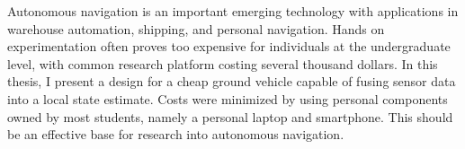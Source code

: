 \begin{abstractpage}
Autonomous navigation is an important emerging technology with applications in warehouse automation, shipping, and  personal navigation. Hands on experimentation often proves too expensive for individuals at the undergraduate level, with common research platform costing several thousand dollars. In this thesis, I present a design for a cheap ground vehicle capable of fusing sensor data into a local state estimate. Costs were minimized by using personal components owned by most students, namely a personal laptop and smartphone. This should be an effective base for research into autonomous navigation.
\end{abstractpage}